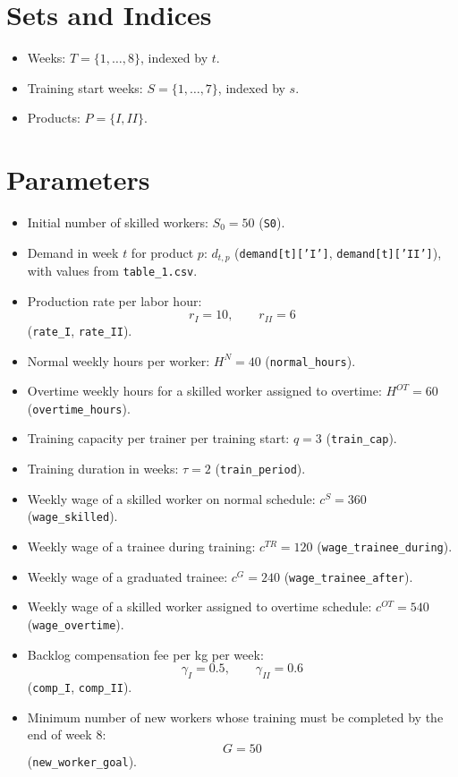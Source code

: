 \section*{Sets and Indices}

\begin{itemize}
    \item Weeks: $T=\{1,\dots,8\}$, indexed by $t$.
    \item Training start weeks: $S=\{1,\dots,7\}$, indexed by $s$.
    \item Products: $P=\{I,II\}$.
\end{itemize}

\section*{Parameters}

\begin{itemize}
    \item Initial number of skilled workers: $S_0=50$ (\texttt{S0}).
    \item Demand in week $t$ for product $p$: $d_{t,p}$ (\texttt{demand[t]['I']}, \texttt{demand[t]['II']}), with values from \texttt{table\_1.csv}.
    \item Production rate per labor hour:
    \[
    r_I=10,\qquad r_{II}=6
    \]
    (\texttt{rate\_I}, \texttt{rate\_II}).
    \item Normal weekly hours per worker: $H^N=40$ (\texttt{normal\_hours}).
    \item Overtime weekly hours for a skilled worker assigned to overtime: $H^{OT}=60$ (\texttt{overtime\_hours}).
    \item Training capacity per trainer per training start: $q=3$ (\texttt{train\_cap}).
    \item Training duration in weeks: $\tau=2$ (\texttt{train\_period}).
    \item Weekly wage of a skilled worker on normal schedule: $c^S=360$ (\texttt{wage\_skilled}).
    \item Weekly wage of a trainee during training: $c^{TR}=120$ (\texttt{wage\_trainee\_during}).
    \item Weekly wage of a graduated trainee: $c^G=240$ (\texttt{wage\_trainee\_after}).
    \item Weekly wage of a skilled worker assigned to overtime schedule: $c^{OT}=540$ (\texttt{wage\_overtime}).
    \item Backlog compensation fee per kg per week:
    \[
    \gamma_I=0.5,\qquad \gamma_{II}=0.6
    \]
    (\texttt{comp\_I}, \texttt{comp\_II}).
    \item Minimum number of new workers whose training must be completed by the end of week 8:
    \[
    G=50
    \]
    (\texttt{new\_worker\_goal}).
\end{itemize}

